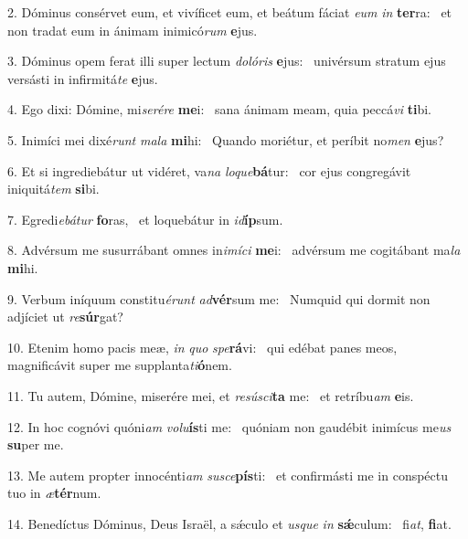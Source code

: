 2. Dóminus consérvet eum, et vivíficet eum, et beátum fáciat \textit{e}\textit{um} \textit{in} \textbf{ter}ra: \ast\  et non tradat eum in ánimam inimicó\textit{rum} \textbf{e}jus.\

3. Dóminus opem ferat illi super lectum \textit{do}\textit{ló}\textit{ris} \textbf{e}jus: \ast\  univérsum stratum ejus versásti in infirmitá\textit{te} \textbf{e}jus.\

4. Ego dixi: Dómine, mi\textit{se}\textit{ré}\textit{re} \textbf{me}i: \ast\  sana ánimam meam, quia peccá\textit{vi} \textbf{ti}bi.\

5. Inimíci mei dixé\textit{runt} \textit{ma}\textit{la} \textbf{mi}hi: \ast\  Quando moriétur, et períbit no\textit{men} \textbf{e}jus?\

6. Et si ingrediebátur ut vidéret, va\textit{na} \textit{lo}\textit{que}\textbf{bá}tur: \ast\  cor ejus congregávit iniquitá\textit{tem} \textbf{si}bi.\

7. Egredi\textit{e}\textit{bá}\textit{tur} \textbf{fo}ras, \ast\  et loquebátur in \textit{id}\textbf{íp}sum.\

8. Advérsum me susurrábant omnes in\textit{i}\textit{mí}\textit{ci} \textbf{me}i: \ast\  advérsum me cogitábant ma\textit{la} \textbf{mi}hi.\

9. Verbum iníquum constitu\textit{é}\textit{runt} \textit{ad}\textbf{vér}sum me: \ast\  Numquid qui dormit non adjíciet ut \textit{re}\textbf{súr}gat?\

10. Etenim homo pacis meæ, \textit{in} \textit{quo} \textit{spe}\textbf{rá}vi: \ast\  qui edébat panes meos, magnificávit super me supplanta\textit{ti}\textbf{ó}nem.\

11. Tu autem, Dómine, miserére mei, et \textit{re}\textit{sú}\textit{sci}\textbf{ta} me: \ast\  et retríbu\textit{am} \textbf{e}is.\

12. In hoc cognóvi quóni\textit{am} \textit{vo}\textit{lu}\textbf{ís}ti me: \ast\  quóniam non gaudébit inimícus me\textit{us} \textbf{su}per me.\

13. Me autem propter innocénti\textit{am} \textit{su}\textit{sce}\textbf{pís}ti: \ast\  et confirmásti me in conspéctu tuo in \textit{æ}\textbf{tér}num.\

14. Benedíctus Dóminus, Deus Israël, a sǽculo et \textit{us}\textit{que} \textit{in} \textbf{sǽ}culum: \ast\  fi\textit{at}, \textbf{fi}at.\

